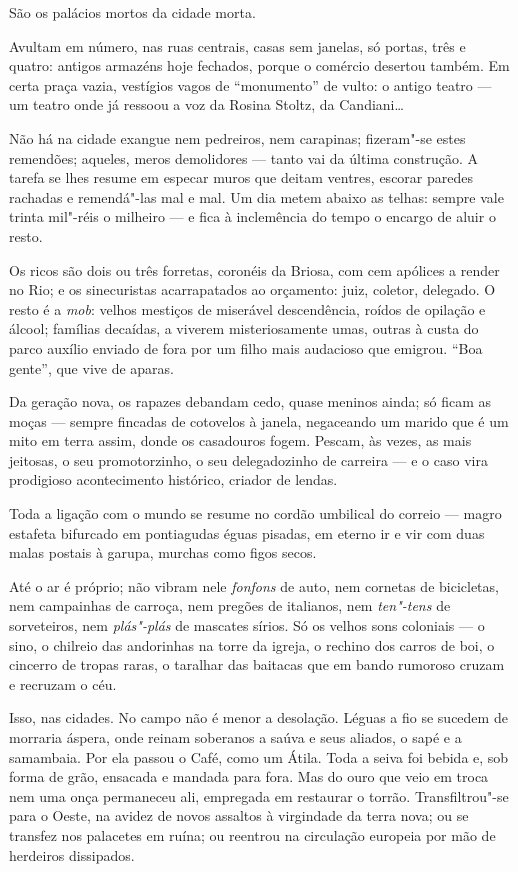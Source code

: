 São os palácios mortos da cidade morta.

Avultam em número, nas ruas centrais, casas sem janelas, só portas, três
e quatro: antigos armazéns hoje fechados, porque o comércio desertou
também. Em certa praça vazia, vestígios vagos de ``monumento'' de vulto:
o antigo teatro --- um teatro onde já ressoou a voz da Rosina Stoltz, da
Candiani\ldots{}

Não há na cidade exangue nem pedreiros, nem carapinas; fizeram"-se estes
remendões; aqueles, meros demolidores --- tanto vai da última
construção. A tarefa se lhes resume em especar muros que deitam ventres,
escorar paredes rachadas e remendá"-las mal e mal. Um dia metem abaixo as
telhas: sempre vale trinta mil"-réis o milheiro --- e fica à inclemência
do tempo o encargo de aluir o resto.

Os ricos são dois ou três forretas, coronéis da Briosa, com cem apólices
a render no Rio; e os sinecuristas acarrapatados ao orçamento: juiz,
coletor, delegado. O resto é a \emph{mob}: velhos mestiços de miserável
descendência, roídos de opilação e álcool; famílias decaídas, a viverem
misteriosamente umas, outras à custa do parco auxílio enviado de fora
por um filho mais audacioso que emigrou. ``Boa gente'', que vive de
aparas.

Da geração nova, os rapazes debandam cedo, quase meninos ainda; só ficam
as moças --- sempre fincadas de cotovelos à janela, negaceando um marido
que é um mito em terra assim, donde os casadouros fogem. Pescam, às
vezes, as mais jeitosas, o seu promotorzinho, o seu delegadozinho de
carreira --- e o caso vira prodigioso acontecimento histórico, criador
de lendas.

Toda a ligação com o mundo se resume no cordão umbilical do correio ---
magro estafeta bifurcado em pontiagudas éguas pisadas, em eterno ir e
vir com duas malas postais à garupa, murchas como figos secos.

Até o ar é próprio; não vibram nele \emph{fonfons} de auto, nem cornetas
de bicicletas, nem campainhas de carroça, nem pregões de italianos, nem
\emph{ten"-tens} de sorveteiros, nem \emph{plás"-plás} de mascates sírios.
Só os velhos sons coloniais --- o sino, o chilreio das andorinhas na
torre da igreja, o rechino dos carros de boi, o cincerro de tropas
raras, o taralhar das baitacas que em bando rumoroso cruzam e recruzam o
céu.

Isso, nas cidades. No campo não é menor a desolação. Léguas a fio se
sucedem de morraria áspera, onde reinam soberanos a saúva e seus
aliados, o sapé e a samambaia. Por ela passou o Café, como um Átila.
Toda a seiva foi bebida e, sob forma de grão, ensacada e mandada para
fora. Mas do ouro que veio em troca nem uma onça permaneceu ali,
empregada em restaurar o torrão. Transfiltrou"-se para o Oeste, na avidez
de novos assaltos à virgindade da terra nova; ou se transfez nos
palacetes em ruína; ou reentrou na circulação europeia por mão de
herdeiros dissipados.

